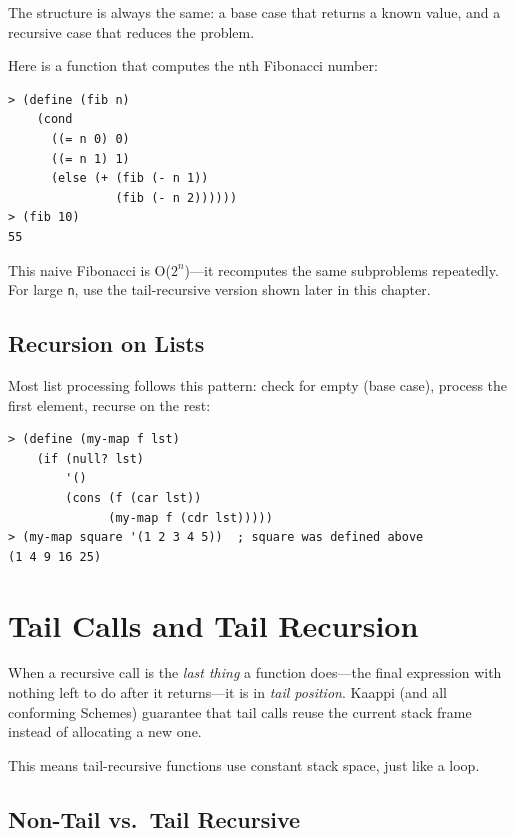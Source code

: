 The structure is always the same: a base case that returns a known value, and a recursive case that reduces the problem.

Here is a function that computes the nth Fibonacci number:

\begin{lstlisting}[style=repl]
> (define (fib n)
    (cond
      ((= n 0) 0)
      ((= n 1) 1)
      (else (+ (fib (- n 1))
               (fib (- n 2))))))
> (fib 10)
55
\end{lstlisting}

\begin{warning}
This naive Fibonacci is O($2^n$)---it recomputes the same subproblems repeatedly. For large \texttt{n}, use the tail-recursive version shown later in this chapter.
\end{warning}

\subsection{Recursion on Lists}

Most list processing follows this pattern: check for empty (base case), process the first element, recurse on the rest:

\begin{lstlisting}[style=repl]
> (define (my-map f lst)
    (if (null? lst)
        '()
        (cons (f (car lst))
              (my-map f (cdr lst)))))
> (my-map square '(1 2 3 4 5))  ; square was defined above
(1 4 9 16 25)
\end{lstlisting}

\section{Tail Calls and Tail Recursion}

When a recursive call is the \emph{last thing} a function does---the final expression with nothing left to do after it returns---it is in \emph{tail position}. Kaappi (and all conforming Schemes) guarantee that tail calls reuse the current stack frame instead of allocating a new one.

This means tail-recursive functions use constant stack space, just like a loop.

\subsection{Non-Tail vs.\ Tail Recursive}

